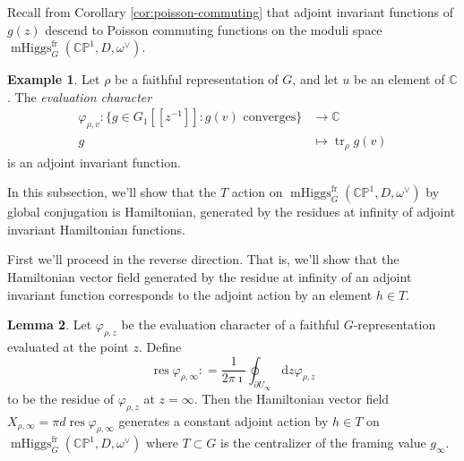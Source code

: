 \documentclass[11pt, oneside, reqno]{amsart}
\theoremstyle{definition} \newtheorem{definition}{Definition}[section]
\newtheorem{lemma}[definition]{Lemma}
\theoremstyle{definition} \newtheorem{remark}[definition]{Remark}
\theoremstyle{definition} \newtheorem{remarks}[definition]{Remarks}
\theoremstyle{definition} \newtheorem{question}[definition]{Question}
\theoremstyle{definition} \newtheorem*{note}{Note}
\theoremstyle{definition} \newtheorem{example}[definition]{Example}
\theoremstyle{definition} \newtheorem{examples}[definition]{Examples}
\newcommand{\bb}[1]{\mathbb{#1}}
\newcommand{\CC}{\mathbb{C}}
\DeclareMathOperator{\tr}{tr}
\DeclareMathOperator{\res}{res}
\DeclareMathOperator{\mhiggs}{mHiggs}
\renewcommand{\d}{\mathrm{d}}
\newcommand{\fr}{\mathrm{fr}}
\begin{document}
Recall from Corollary \ref{cor:poisson-commuting} that adjoint invariant functions of $g(z)$ descend to Poisson commuting functions on the moduli space $\mhiggs^\fr_G(\bb{CP}^1, D, \omega^\vee)$.
 
\begin{example}
Let $\rho$ be a faithful representation of $G$, and let $u$ be an element of $\CC$. The \emph{evaluation character}  
\begin{align*}
\varphi_{\rho,v} \colon \{g \in G_1[[z^{-1}]] \colon g(v) \text{ converges}\} &\to \mathbb{C}\\
g &\mapsto  \tr_{\rho} g(v)
\end{align*}
is an adjoint invariant function. 
\end{example}

In this subsection, we'll show that the $T$ action on $\mhiggs^\fr_G(\bb{CP}^1, D, \omega^\vee)$ by global conjugation is Hamiltonian, generated by the residues at infinity of adjoint invariant Hamiltonian functions.

First we'll proceed in the reverse direction.  That is, we'll show that the Hamiltonian vector field generated by the residue at infinity of an adjoint invariant function corresponds to the adjoint action by an element $h \in T$. 
 \begin{lemma} 
 Let $\varphi_{\rho, z}$ be the evaluation character of a faithful $G$-representation evaluated at the point $z$. Define
   \begin{equation}
    \res  \varphi_{\rho, \infty} : = \frac{1}{2 \pi \imath} \oint_{\partial U_{\infty}}  \d z \varphi_{\rho, z} 
   \end{equation}
   to be the residue of $\varphi_{\rho, z}$ at $z=\infty$.   Then the Hamiltonian vector field  $X_{\rho, \infty} = \pi d \res \varphi_{\rho, \infty}$ generates a constant adjoint action by $h \in T$ on $\mhiggs^\fr_G(\bb{CP}^1, D, \omega^\vee)$
   where $T \subset G$ is the centralizer of the framing value $g_\infty$. 
 \end{lemma}
 
\end{document}
